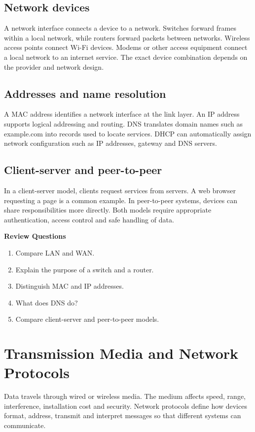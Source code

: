 \documentclass[11pt,openany,oneside]{book}
\newcommand{\reviewtitle}{\par\noindent\textbf{\color{Navy}Review Questions}\par}
\begin{document}
\section{Network devices}
A network interface connects a device to a network. Switches forward frames within a local network, while routers forward packets between networks. Wireless access points connect Wi-Fi devices. Modems or other access equipment connect a local network to an internet service. The exact device combination depends on the provider and network design.

\section{Addresses and name resolution}
A MAC address identifies a network interface at the link layer. An IP address supports logical addressing and routing. DNS translates domain names such as example.com into records used to locate services. DHCP can automatically assign network configuration such as IP addresses, gateway and DNS servers.

\section{Client-server and peer-to-peer}
In a client-server model, clients request services from servers. A web browser requesting a page is a common example. In peer-to-peer systems, devices can share responsibilities more directly. Both models require appropriate authentication, access control and safe handling of data.

\reviewtitle
\begin{enumerate}
\item Compare LAN and WAN.
\item Explain the purpose of a switch and a router.
\item Distinguish MAC and IP addresses.
\item What does DNS do?
\item Compare client-server and peer-to-peer models.
\end{enumerate}

\chapter{Transmission Media and Network Protocols}
Data travels through wired or wireless media. The medium affects speed, range, interference, installation cost and security. Network protocols define how devices format, address, transmit and interpret messages so that different systems can communicate.
\end{document}

